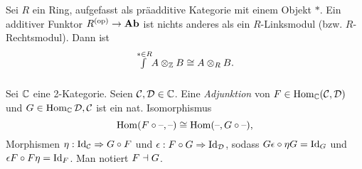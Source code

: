 \documentclass{cheat-sheet}
\begin{document}
\begin{bsp}
  Sei $R$ ein Ring, aufgefasst als präadditive Kategorie mit einem Objekt $*$.
  Ein additiver Funktor $R^{(\mathrm{op})} \to \mathbf{Ab}$ ist nichts anderes als ein $R$-Linksmodul (bzw. $R$-Rechtsmodul). Dann ist
  \[ {\textstyle \int\limits_{}^{* \in R}} A \otimes_{\mathbb{Z}} B \cong A \otimes_R B. \]
\end{bsp}

\begin{defn}
  Sei $\mathbb{C}$ eine 2-Kategorie. Seien $\mathcal{C}, \mathcal{D} \in \mathbb{C}$. Eine \emph{Adjunktion} von $F \in \operatorname{Hom}_{\mathbb{C}}(\mathcal{C}, \mathcal{D})$ und $G \in \operatorname{Hom}_{\mathbb{C}}{\mathcal{D}, \mathcal{C}}$ ist ein nat. Isomorphismus
  \[ \operatorname{Hom}(F \circ \text{--}, \text{--}) \cong \operatorname{Hom}(\text{--}, G \circ \text{--}), \]
  \dh{} Morphismen $\eta : \operatorname{Id}_{\mathcal{C}} \Rightarrow G \circ F$ und $\epsilon : F \circ G \Rightarrow \operatorname{Id}_{\mathcal{D}}$, sodass $G \epsilon \circ \eta G = \operatorname{Id}_G$ und $\epsilon F \circ F \eta = \operatorname{Id}_F$.
  Man notiert $F \dashv G$.
\end{defn}
\end{document}
